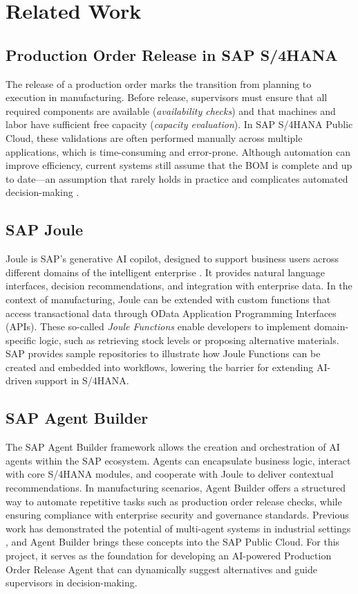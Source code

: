 \chapter{Related Work}
\label{chap:RelatedWork}

\section{Production Order Release in SAP S/4HANA}
The release of a production order marks the transition from planning to execution in manufacturing. Before release, supervisors must ensure that all required components are available (\emph{availability checks}) and that machines and labor have sufficient free capacity (\emph{capacity evaluation}). In SAP S/4HANA Public Cloud, these validations are often performed manually across multiple applications, which is time-consuming and error-prone. Although automation can improve efficiency, current systems still assume that the BOM is complete and up to date—an assumption that rarely holds in practice and complicates automated decision-making \cite{sapprodrelease2025}.

\section{SAP Joule}
Joule is SAP’s generative AI copilot, designed to support business users across different domains of the intelligent enterprise \cite{sapjoule2025}. It provides natural language interfaces, decision recommendations, and integration with enterprise data. In the context of manufacturing, Joule can be extended with custom functions that access transactional data through OData Application Programming Interfaces (APIs). These so-called \emph{Joule Functions} enable developers to implement domain-specific logic, such as retrieving stock levels or proposing alternative materials. SAP provides sample repositories to illustrate how Joule Functions can be created and embedded into workflows, lowering the barrier for extending AI-driven support in S/4HANA.

\section{SAP Agent Builder}
The SAP Agent Builder framework allows the creation and orchestration of AI agents within the SAP ecosystem. Agents can encapsulate business logic, interact with core S/4HANA modules, and cooperate with Joule to deliver contextual recommendations. In manufacturing scenarios, Agent Builder offers a structured way to automate repetitive tasks such as production order release checks, while ensuring compliance with enterprise security and governance standards. Previous work has demonstrated the potential of multi-agent systems in industrial settings \cite{wuest2016}, and Agent Builder brings these concepts into the SAP Public Cloud. For this project, it serves as the foundation for developing an AI-powered Production Order Release Agent that can dynamically suggest alternatives and guide supervisors in decision-making.
